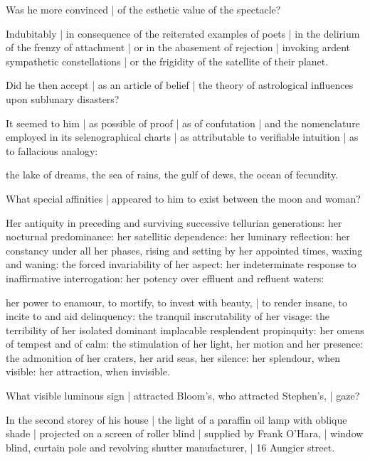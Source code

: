 Was he more convinced |
of the esthetic value of the spectacle?

\Poetry
Indubitably |
in consequence of the reiterated examples of poets |
in the delirium of the frenzy of attachment |
or in the abasement of rejection |
invoking ardent sympathetic constellations |
or the frigidity of the satellite of their planet.%


Did he then accept |
as an article of belief |
the theory of astrological influences upon sublunary disasters?

\Science
It seemed to him |
as possible of proof |
as of confutation |
and the nomenclature employed in its selenographical charts |
as attributable to verifiable intuition |
as to fallacious analogy:

\Poetry
the lake of dreams, the sea of rains, the gulf of dews, the ocean of fecundity.


What special affinities |
appeared to him to exist between the moon and woman?

\Philosophy
Her antiquity in preceding and surviving successive tellurian generations:
her nocturnal predominance:
her satellitic dependence:
her luminary reflection:
her constancy under all her phases,
rising and setting by her appointed times,
waxing and waning:
the forced invariability of her aspect:
her indeterminate response to inaffirmative interrogation:
her potency over effluent and refluent waters:

\Poetry
her power to enamour, to mortify, to invest with beauty, |
to render insane, to incite to and aid delinquency:
the tranquil inscrutability of her visage:
the terribility of her isolated dominant implacable resplendent propinquity:
her omens of tempest and of calm:
the stimulation of her light, her motion and her presence:
the admonition of her craters, her arid seas, her silence:
her splendour, when visible:
her attraction,
when invisible.



What visible luminous sign |
attracted Bloom's, who attracted Stephen's, |
gaze?

\Household
In the second storey
of his
house |
the light of a paraffin oil lamp with oblique shade |
projected on a screen of roller blind |
supplied by Frank O'Hara, |
window blind, curtain pole and revolving shutter manufacturer, |
16 Aungier street.



